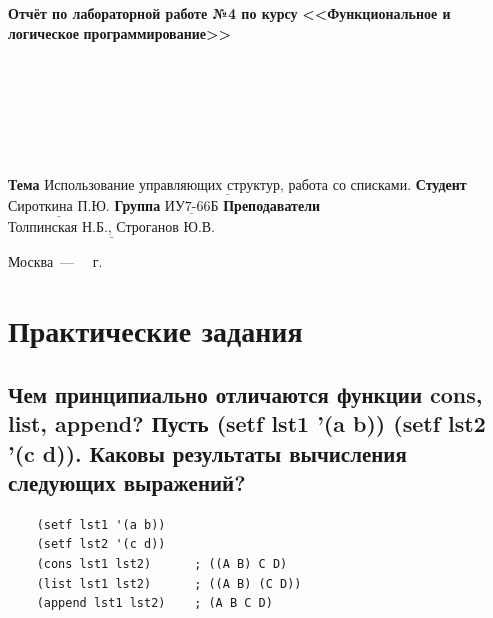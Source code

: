 \documentclass[12pt]{report}
\begin{document}
\begin{titlepage}
	
	\begin{center}
		\noindent\begin{minipage}{1.3\textwidth}\centering
			\Large\textbf{  Отчёт по лабораторной работе №4 по курсу}\newline\newline
			\textbf{<<Функциональное и логическое}\newline
			\textbf{\indent\indent\indent программирование>>}\newline
		\end{minipage}
	\end{center}
	
	~\\\\\\\\\\\\
	\large
	\noindent\textbf{Тема } $\underline{\text{Использование управляющих структур, работа со списками.}}$\newline\newline
	\noindent\textbf{Студент } $\underline{\text{Сироткина П.Ю.}}$\newline\newline
	\noindent\textbf{Группа } $\underline{\text{ИУ7-66Б}}$\newline\newline
	\noindent\textbf{Преподаватели } $\underline{\text{Толпинская Н.Б., Строганов Ю.В.}}$\newline\newline\newline
	
	\begin{center}
		\vfill
		Москва~---~\the\year
		~г.
	\end{center}
\end{titlepage}

\chapter{Практические задания}

\section{Чем принципиально отличаются функции cons, list, append? Пусть (setf lst1 '(a b)) (setf lst2 '(c d)). Каковы результаты вычисления следующих выражений?}

\begin{lstlisting}
	(setf lst1 '(a b))
	(setf lst2 '(c d))
	(cons lst1 lst2)      ; ((A B) C D)
	(list lst1 lst2)      ; ((A B) (C D))
	(append lst1 lst2)    ; (A B C D)
\end{lstlisting}
\end{document}
